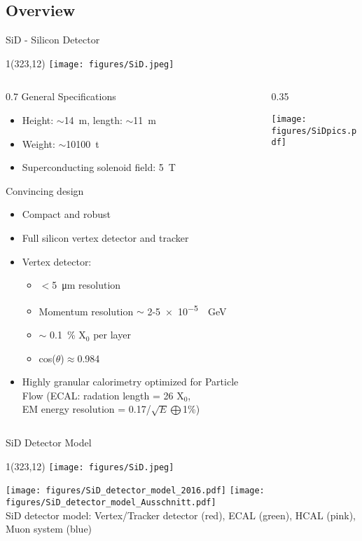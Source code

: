 \documentclass[xcolor={dvipsnames}]{beamer}
\newcommand{\sidlogo}{
  \setlength{\TPHorizModule}{1pt}
  \setlength{\TPVertModule}{1pt}
  \begin{textblock}{1}(323,12)
   \texttt{[image: figures/SiD.jpeg]}
  \end{textblock}
  }
\begin{document}
\subsection{Overview}
\begin{frame}{SiD - Silicon Detector}
\sidlogo

\begin{columns}
\begin{column}{0.7\textwidth}
\alert{General Specifications}
\begin{itemize}
\item Height: $\sim$\SI{14}{\metre}, length:  $\sim$\SI{11}{\metre}
\item Weight: $\sim$\SI{10100}{\tonne}
\item Superconducting solenoid field: \SI{5}{\tesla}
\end{itemize}
\alert{Convincing design}
 \begin{itemize}
  \item Compact and robust
  \item Full silicon vertex detector and tracker
  \item Vertex detector:
  \begin{itemize}
   \item $<$\SI{5}{\micro\metre} resolution
   \item Momentum resolution $\sim$ 2-\SI{5e-5}{\per\giga\electronvolt}
   \item $\sim$ \SI{0.1}{\percent} X$_0$ per layer
  \item cos($\theta$)$\approx$0.984
  \end{itemize}

  \item Highly granular calorimetry optimized for Particle Flow (ECAL: radation length = 26 X$_0$, \\EM energy resolution = 0.17/$\sqrt{E}\bigoplus$1\%)
 \end{itemize}
\end{column}

\begin{column}{0.35\textwidth}
\begin{center}
\texttt{[image: figures/SiDpics.pdf]}
\end{center}
\end{column}
\end{columns}

\end{frame}


\begin{frame}{SiD Detector Model} 
\sidlogo
\texttt{[image: figures/SiD\_detector\_model\_2016.pdf]}
\texttt{[image: figures/SiD\_detector\_model\_Ausschnitt.pdf]}\\
SiD detector model: Vertex/Tracker detector (red), ECAL (green), HCAL (pink), Muon system (blue)
\end{frame}
\end{document}
